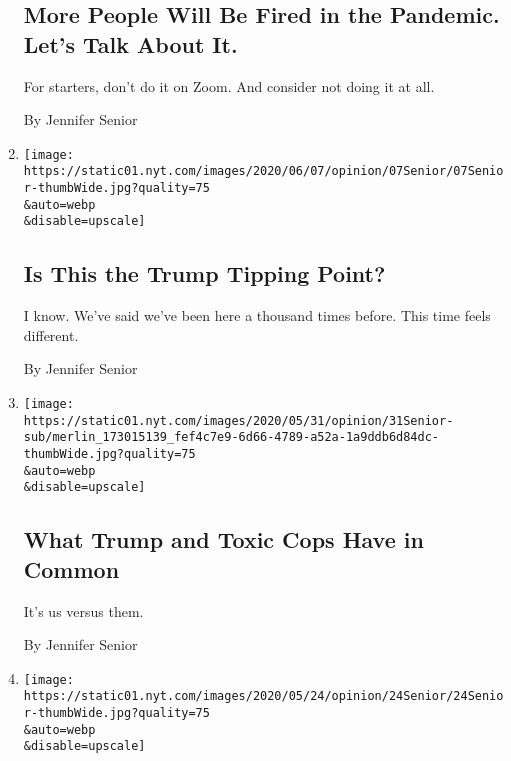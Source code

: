 \begin{enumerate}
  \hypertarget{more-people-will-be-fired-in-the-pandemic-lets-talk-about-it}{%
  \subsection{More People Will Be Fired in the Pandemic. Let's Talk
  About
  It.}\label{more-people-will-be-fired-in-the-pandemic-lets-talk-about-it}}

  For starters, don't do it on Zoom. And consider not doing it at all.

  By Jennifer Senior
\item
  \href{/2020/06/07/opinion/trump-mattis-polls.html}{}

  \texttt{[image: https://static01.nyt.com/images/2020/06/07/opinion/07Senior/07Senior-thumbWide.jpg?quality=75\\\&auto=webp\\\&disable=upscale]}

  \hypertarget{is-this-the-trump-tipping-point}{%
  \subsection{Is This the Trump Tipping
  Point?}\label{is-this-the-trump-tipping-point}}

  I know. We've said we've been here a thousand times before. This time
  feels different.

  By Jennifer Senior
\item
  \href{/2020/05/31/opinion/trump-police-george-floyd.html}{}

  \texttt{[image: https://static01.nyt.com/images/2020/05/31/opinion/31Senior-sub/merlin\_173015139\_fef4c7e9-6d66-4789-a52a-1a9ddb6d84dc-thumbWide.jpg?quality=75\\\&auto=webp\\\&disable=upscale]}

  \hypertarget{what-trump-and-toxic-cops-have-in-common}{%
  \subsection{What Trump and Toxic Cops Have in
  Common}\label{what-trump-and-toxic-cops-have-in-common}}

  It's us versus them.

  By Jennifer Senior
\item
  \href{/2020/05/24/opinion/coronavirus-parents-work-from-home.html}{}

  \texttt{[image: https://static01.nyt.com/images/2020/05/24/opinion/24Senior/24Senior-thumbWide.jpg?quality=75\\\&auto=webp\\\&disable=upscale]}

  \hypertarget{camp-is-canceled-three-more-months-of-family-time-help}{%
}
\end{enumerate}
